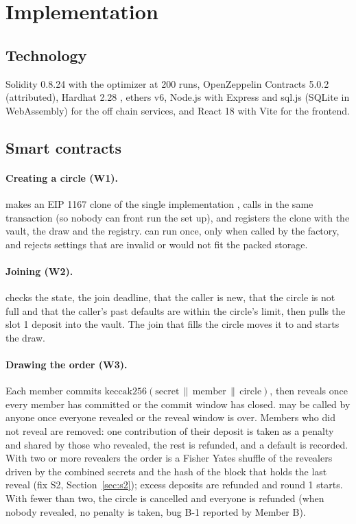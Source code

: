 \section{Implementation}
\label{sec:impl}

\subsection{Technology}
Solidity 0.8.24 with the optimizer at 200 runs, OpenZeppelin Contracts 5.0.2 \cite{openzeppelin}
(attributed), Hardhat 2.28 \cite{hardhat}, ethers v6, Node.js with Express and sql.js (SQLite in
WebAssembly) for the off chain services, and React 18 with Vite for the frontend.

\subsection{Smart contracts}
\paragraph{Creating a circle (W1).}  makes an EIP 1167 clone of
the single  implementation \cite{eip1167}, calls  in the same transaction
(so nobody can front run the set up), and registers the clone with the vault, the draw and the
registry.  can run once, only when called by the factory, and rejects settings that
are invalid or would not fit the packed storage.

\paragraph{Joining (W2).}  checks the state, the join deadline, that the caller is new, that
the circle is not full and that the caller's past defaults are within the circle's limit, then pulls
the slot 1 deposit into the vault. The join that fills the circle moves it to  and
starts the draw.

\paragraph{Drawing the order (W3).} Each member commits
$\text{keccak256}(\text{secret}\,\|\,\text{member}\,\|\,\text{circle})$, then reveals once every member has
committed or the commit window has closed.  may be called by anyone once everyone
revealed or the reveal window is over. Members who did not reveal are removed: one contribution of
their deposit is taken as a penalty and shared by those who revealed, the rest is refunded, and a
default is recorded. With two or more revealers the order is a Fisher Yates shuffle of the revealers
driven by the combined secrets and the hash of the block that holds the last reveal (fix S2,
Section~\ref{sec:s2}); excess deposits are refunded and round 1 starts. With fewer than two, the
circle is cancelled and everyone is refunded (when nobody revealed, no penalty is taken, bug B-1
reported by Member B).

